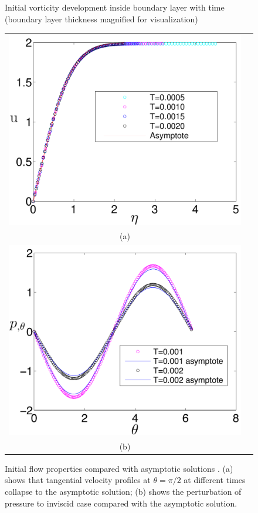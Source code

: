 \begin{figure}
\begin{center}
\begin{tabular}[t]{cc}
\end{tabular}
\end{center}
\caption[Initial vorticity development inside boundary layer]{Initial vorticity development inside boundary layer with time (boundary layer thickness magnified for visualization)}
\label{fig:InitialVorticity}
\end{figure}

\begin{figure}
\begin{center}
\begin{tabular}[t]{cc}
\includegraphics[width=12cm]{./Figures/results/static/u_asymptotic.pdf}  \\
(a) \\
\includegraphics[width=12cm]{./Figures/results/static/p_asymptotic.pdf} \\
(b)
\end{tabular}
\end{center}
 \caption[Initial velocity and pressure inside boundary layer]{Initial flow properties compared with asymptotic solutions \cite{bar1975initial}. (a) shows that tangential velocity profiles at $\theta = \pi/2$ at different times collapse to the asymptotic solution; (b) shows the perturbation of pressure to inviscid case compared with the asymptotic solution.}
 \label{fig:InitialVelocity}
\end{figure}


